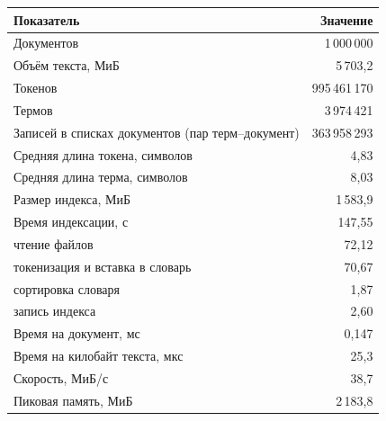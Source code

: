 \begin{tabular}{|p{}|r|}
\hline
Показатель & Значение \\
\hline
Документов & 1\,000\,000 \\
\hline
Объём текста, МиБ & 5\,703,2 \\
\hline
Токенов & 995\,461\,170 \\
\hline
Термов & 3\,974\,421 \\
\hline
Записей в списках документов (пар терм--документ) & 363\,958\,293 \\
\hline
Средняя длина токена, символов & 4,83 \\
\hline
Средняя длина терма, символов & 8,03 \\
\hline
Размер индекса, МиБ & 1\,583,9 \\
\hline
Время индексации, с & 147,55 \\
\hline
\quad чтение файлов & 72,12 \\
\hline
\quad токенизация и вставка в словарь & 70,67 \\
\hline
\quad сортировка словаря & 1,87 \\
\hline
\quad запись индекса & 2,60 \\
\hline
Время на документ, мс & 0,147 \\
\hline
Время на килобайт текста, мкс & 25,3 \\
\hline
Скорость, МиБ/с & 38,7 \\
\hline
Пиковая память, МиБ & 2\,183,8 \\
\hline
\end{tabular}
